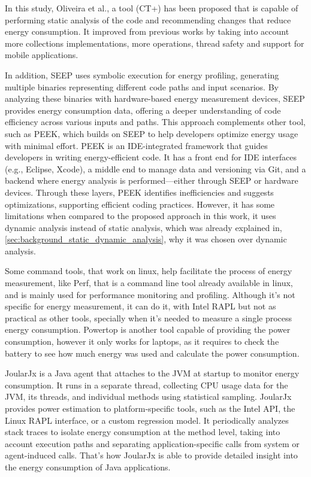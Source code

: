 \documentclass[sigplan]{acmart}
\begin{document}
In this study, Oliveira et al.\cite{8816747}, a tool (CT+) has been proposed that is capable of performing static analysis of the code and recommending changes that reduce energy consumption. It improved from previous works by taking into account more collections implementations, more operations, thread safety and support for mobile applications. 

In addition, SEEP \cite{10.1145/2094091.2094106} uses symbolic execution for energy profiling, generating multiple binaries representing different code paths and input scenarios. By analyzing these binaries with hardware-based energy measurement devices, SEEP provides energy consumption data, offering a deeper understanding of code efficiency across various inputs and paths. This approach complements other tool, such as PEEK\cite{187026}, which builds on SEEP to help developers optimize energy usage with minimal effort. PEEK is an IDE-integrated framework that guides developers in writing energy-efficient code. It has a front end for IDE interfaces (e.g., Eclipse, Xcode), a middle end to manage data and versioning via Git, and a backend where energy analysis is performed—either through SEEP or hardware devices. Through these layers, PEEK identifies inefficiencies and suggests optimizations, supporting efficient coding practices. However, it has some limitations when compared to the proposed approach in this work, it uses dynamic analysis instead of static analysis, which was already explained in, \ref{sec:background_static_dynamic_analysis}, why it was chosen over dynamic analysis.


Some command tools, that work on linux, help facilitate the process of energy measurement, like Perf\cite{perfwiki_main}, that is a command line tool already available in linux, and is mainly used for performance monitoring and profiling. Although it's not specific for energy measurement, it can do it, with Intel RAPL but not as practical as other tools, specially when it's needed to measure a single process energy consumption. Powertop\cite{archlinux_powertop} is another tool capable of providing the power consumption, however it only works for laptops, as it requires to check the battery to see how much energy was used and calculate the power consumption.

JoularJx\cite{noureddine-ie-2022} is a Java agent that attaches to the JVM at startup to monitor energy consumption. It runs in a separate thread, collecting CPU usage data for the JVM, its threads, and individual methods using statistical sampling. JoularJx provides power estimation to platform-specific tools, such as the Intel API, the Linux RAPL interface, or a custom regression model. It periodically analyzes stack traces to isolate energy consumption at the method level, taking into account execution paths and separating application-specific calls from system or agent-induced calls. That's how JoularJx is able to provide detailed insight into the energy consumption of Java applications.
\end{document}
